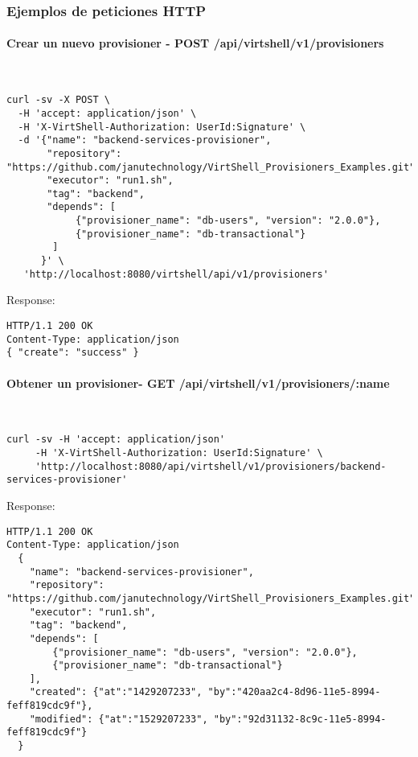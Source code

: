\subsubsection{Ejemplos de peticiones HTTP}

\paragraph{Crear un nuevo provisioner - POST /api/virtshell/v1/provisioners} ~\\


\begin{lstlisting}[style=json]
curl -sv -X POST \
  -H 'accept: application/json' \
  -H 'X-VirtShell-Authorization: UserId:Signature' \
  -d '{"name": "backend-services-provisioner",
       "repository": "https://github.com/janutechnology/VirtShell_Provisioners_Examples.git",
       "executor": "run1.sh",
       "tag": "backend",
       "depends": [
            {"provisioner_name": "db-users", "version": "2.0.0"},
            {"provisioner_name": "db-transactional"}
        ]
      }' \
   'http://localhost:8080/virtshell/api/v1/provisioners'
\end{lstlisting}

Response:

\begin{lstlisting}[style=json]
HTTP/1.1 200 OK
Content-Type: application/json
{ "create": "success" }
\end{lstlisting}

\paragraph{Obtener un provisioner- GET /api/virtshell/v1/provisioners/:name} ~\\

\begin{lstlisting}[style=json]
curl -sv -H 'accept: application/json' 
     -H 'X-VirtShell-Authorization: UserId:Signature' \ 
     'http://localhost:8080/api/virtshell/v1/provisioners/backend-services-provisioner'
\end{lstlisting}

Response:

\begin{lstlisting}[style=json]
HTTP/1.1 200 OK
Content-Type: application/json
  {
    "name": "backend-services-provisioner",
    "repository": "https://github.com/janutechnology/VirtShell_Provisioners_Examples.git",
    "executor": "run1.sh",
    "tag": "backend",
    "depends": [
        {"provisioner_name": "db-users", "version": "2.0.0"},
        {"provisioner_name": "db-transactional"}
    ],
    "created": {"at":"1429207233", "by":"420aa2c4-8d96-11e5-8994-feff819cdc9f"},
    "modified": {"at":"1529207233", "by":"92d31132-8c9c-11e5-8994-feff819cdc9f"}    
  }
\end{lstlisting}

